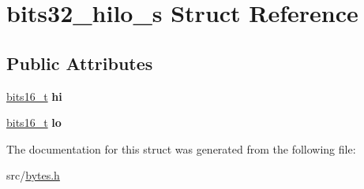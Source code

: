 \hypertarget{structbits32__hilo__s}{}\section{bits32\+\_\+hilo\+\_\+s Struct Reference}
\label{structbits32__hilo__s}
\subsection*{Public Attributes}
\begin{DoxyCompactItemize}
\item 
\hypertarget{structbits32__hilo__s_ada3e7b434275497de479184a4daf010b}{}\label{structbits32__hilo__s_ada3e7b434275497de479184a4daf010b} 
\hyperlink{unionbits16__s}{bits16\+\_\+t} {\bfseries hi}
\item 
\hypertarget{structbits32__hilo__s_a2aa55ad6da1c8e3692bfd378d0db89e8}{}\label{structbits32__hilo__s_a2aa55ad6da1c8e3692bfd378d0db89e8} 
\hyperlink{unionbits16__s}{bits16\+\_\+t} {\bfseries lo}
\end{DoxyCompactItemize}


The documentation for this struct was generated from the following file\+:\begin{DoxyCompactItemize}
\item 
src/\hyperlink{bytes_8h}{bytes.\+h}\end{DoxyCompactItemize}
